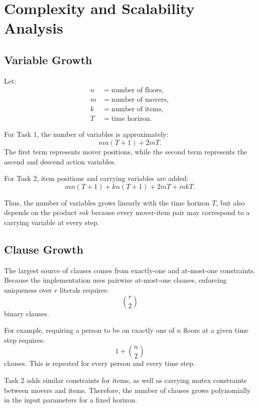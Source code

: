 \section{Complexity and Scalability Analysis} \label{sec:complexity-and-scalability-analysis}
\subsection{Variable Growth} \label{subsec:variable-growth}

Let:
\begin{align*}
    n &= \text{number of floors}, \\
    m &= \text{number of movers}, \\
    k &= \text{number of items}, \\
    T &= \text{time horizon}.
\end{align*}

\noindent For Task 1, the number of variables is approximately:
\[
    m n (T+1) + 2mT.
\]
The first term represents mover positions, while the second term represents the ascend and descend action variables.

\noindent For Task 2, item positions and carrying variables are added:
\[
    m n (T+1) + k n (T+1) + 2mT + mkT.
\]

\noindent Thus, the number of variables grows linearly with the time horizon $T$, but also depends on the product $mk$ because every mover-item pair may correspond to a carrying variable at every step.

\subsection{Clause Growth} \label{subsec:clause-growth}

The largest source of clauses comes from exactly-one and at-most-one constraints.
Because the implementation uses pairwise at-most-one clauses, enforcing uniqueness over $r$ literals requires:
\[
    \binom{r}{2}
\]
binary clauses.

\noindent For example, requiring a person to be on exactly one of $n$ floors at a given time step requires:
\[
    1 + \binom{n}{2}
\]
clauses.
This is repeated for every person and every time step.

\noindent Task 2 adds similar constraints for items, as well as carrying mutex constraints between movers and items.
Therefore, the number of clauses grows polynomially in the input parameters for a fixed horizon.


